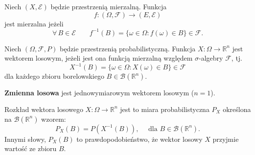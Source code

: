 \documentclass[final,a4paper,openany,12pt]{mwbk}
\begin{document}
\begin{Def}
Niech $(X,\mathcal{E})$ będzie przestrzenią mierzalną.
Funkcja
\[
f \colon (\Omega,\mathcal{F}) \longrightarrow (E,\mathcal{E})
\]jest mierzalna jeżeli
\[
\forall\, B \in \mathcal{E} \qquad
f^{-1}(B)=\{\omega \in \Omega : f(\omega) \in B\}\in\mathcal{F}.
\]
\end{Def}

\begin{Def}
Niech $(\Omega, \mathcal{F}, P)$ będzie przestrzenią probabilistyczną.
Funkcja $X \colon \Omega \longrightarrow \mathbb{R}^n$ jest wektorem losowym, jeżeli jest ona funkcją mierzalną względem $\sigma$-algebry $\mathcal{F}$, tj.
\[
X^{-1}(B) = \{\omega \in \Omega : X(\omega) \in B\} \in \mathcal{F}
\]
dla każdego zbioru borelowskiego $B \in \mathcal{B}(\mathbb{R}^n)$.
\par\noindent
\textbf{Zmienna losowa} jest jednowymiarowym wektorem losowym ($n=1$).
\end{Def}

\begin{Def}
Rozkład wektora losowego $X \colon \Omega \longrightarrow \mathbb{R}^n$ jest to miara probabilistyczna $P_X$ określona na $\mathcal{B}(\mathbb{R}^n)$ wzorem:
\[
P_X(B) = P(X^{-1}(B)), \quad \text{ dla } B \in \mathcal{B}(\mathbb{R}^n).
\]
Innymi słowy, $P_X(B)$ to prawdopodobieństwo, że wektor losowy $X$ przyjmie wartość ze zbioru $B$.
\end{Def}
\end{document}
